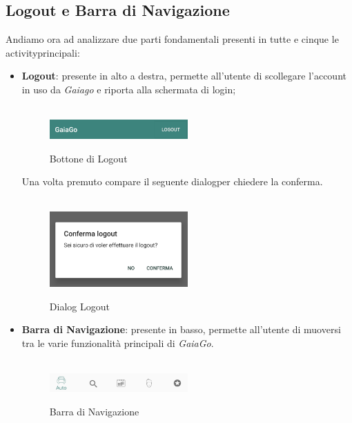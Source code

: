 \subsection{Logout e Barra di Navigazione}
Andiamo ora ad analizzare due parti fondamentali presenti in tutte e cinque le activity\glosp principali:
\begin{itemize}
	\item \textbf{Logout}: presente in alto a destra, permette all'utente di scollegare l'account in uso da \textit{Gaiago} e riporta alla schermata di login;
	\\\\
	  \begin{figure}[H] 
	 	\centering 
	 	\includegraphics[width=0.5\textwidth]{res/images/logout.png}\\
	 	\caption{Bottone di Logout}
	 	\label{Login button}
	 \end{figure}
 Una volta premuto compare il seguente dialog\glosp per chiedere la conferma.
 \\\\
 \begin{figure}[H] 
 	\centering 
 	\includegraphics[width=0.5\textwidth]{res/images/logout_press.png}\\
 	\caption{Dialog Logout}
 	\label{Logout_press}
 \end{figure}
 	\item  \textbf{Barra di Navigazione}: presente in basso, permette all'utente di muoversi tra le varie funzionalità principali di \textit{GaiaGo}.
 	\\\\
 	  \begin{figure}[H] 
 	  	\centering 
 	  	\includegraphics[width=0.5\textwidth]{res/images/barra_navigazione.png}\\
 	  	\caption{Barra di Navigazione}
 	  	\label{Barra di navigazione}
 	  \end{figure}
\end{itemize}
\pagebreak

